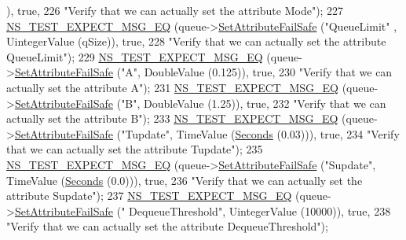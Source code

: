 \begin{DoxyCode}
      ), \textcolor{keyword}{true},
226                          \textcolor{stringliteral}{"Verify that we can actually set the attribute Mode"});
227   \hyperlink{group__testing_ga7304ba46a28d8cf08dfdfd6499cf7068}{NS\_TEST\_EXPECT\_MSG\_EQ} (queue->\hyperlink{classns3_1_1ObjectBase_aa7d333004e970f925a4ed5df275541b5}{SetAttributeFailSafe} (\textcolor{stringliteral}{"QueueLimit"}
      , UintegerValue (qSize)), \textcolor{keyword}{true},
228                          \textcolor{stringliteral}{"Verify that we can actually set the attribute QueueLimit"});
229   \hyperlink{group__testing_ga7304ba46a28d8cf08dfdfd6499cf7068}{NS\_TEST\_EXPECT\_MSG\_EQ} (queue->\hyperlink{classns3_1_1ObjectBase_aa7d333004e970f925a4ed5df275541b5}{SetAttributeFailSafe} (\textcolor{stringliteral}{"A"}, 
      DoubleValue (0.125)), \textcolor{keyword}{true},
230                          \textcolor{stringliteral}{"Verify that we can actually set the attribute A"});
231   \hyperlink{group__testing_ga7304ba46a28d8cf08dfdfd6499cf7068}{NS\_TEST\_EXPECT\_MSG\_EQ} (queue->\hyperlink{classns3_1_1ObjectBase_aa7d333004e970f925a4ed5df275541b5}{SetAttributeFailSafe} (\textcolor{stringliteral}{"B"}, 
      DoubleValue (1.25)), \textcolor{keyword}{true},
232                          \textcolor{stringliteral}{"Verify that we can actually set the attribute B"});
233   \hyperlink{group__testing_ga7304ba46a28d8cf08dfdfd6499cf7068}{NS\_TEST\_EXPECT\_MSG\_EQ} (queue->\hyperlink{classns3_1_1ObjectBase_aa7d333004e970f925a4ed5df275541b5}{SetAttributeFailSafe} (\textcolor{stringliteral}{"Tupdate"}, 
      TimeValue (\hyperlink{group__timecivil_ga33c34b816f8ff6628e33d5c8e9713b9e}{Seconds} (0.03))), \textcolor{keyword}{true},
234                          \textcolor{stringliteral}{"Verify that we can actually set the attribute Tupdate"});
235   \hyperlink{group__testing_ga7304ba46a28d8cf08dfdfd6499cf7068}{NS\_TEST\_EXPECT\_MSG\_EQ} (queue->\hyperlink{classns3_1_1ObjectBase_aa7d333004e970f925a4ed5df275541b5}{SetAttributeFailSafe} (\textcolor{stringliteral}{"Supdate"}, 
      TimeValue (\hyperlink{group__timecivil_ga33c34b816f8ff6628e33d5c8e9713b9e}{Seconds} (0.0))), \textcolor{keyword}{true},
236                          \textcolor{stringliteral}{"Verify that we can actually set the attribute Supdate"});
237   \hyperlink{group__testing_ga7304ba46a28d8cf08dfdfd6499cf7068}{NS\_TEST\_EXPECT\_MSG\_EQ} (queue->\hyperlink{classns3_1_1ObjectBase_aa7d333004e970f925a4ed5df275541b5}{SetAttributeFailSafe} (\textcolor{stringliteral}{"
      DequeueThreshold"}, UintegerValue (10000)), \textcolor{keyword}{true},
238                          \textcolor{stringliteral}{"Verify that we can actually set the attribute DequeueThreshold"});

\end{DoxyCode}
